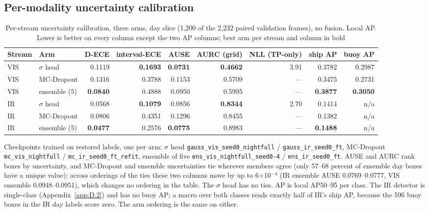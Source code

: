 \documentclass[journal,onecolumn]{IEEEtran}
\begin{document}
\subsection{Per-modality uncertainty calibration}\label{app:E.1}
\begin{table}[htbp]
\centering
\footnotesize
\caption{Per-stream uncertainty calibration, three arms, day slice (1,200 of the 2,232 paired validation frames), no fusion. Local AP. Lower is better on every column except the two AP columns; best arm per stream and column in bold}
\label{tab:9}
\setlength{\tabcolsep}{3pt}
\begin{adjustbox}{max width=\linewidth}
\begin{tabular}{llrrrrrrr}
\toprule
Stream & Arm & D-ECE & interval-ECE & AUSE & AURC (grid) & NLL (TP-only) & ship AP & buoy AP \\
\midrule
VIS & $\sigma$ head & 0.1119 & \textbf{0.1693} & \textbf{0.0731} & \textbf{0.4662} & 3.91 & 0.3782 & 0.2987 \\
VIS & MC-Dropout & 0.1316 & 0.3788 & 0.1153 & 0.5709 & --- & 0.3475 & 0.2731 \\
VIS & ensemble (5) & \textbf{0.0840} & 0.4888 & 0.0950 & 0.5995 & --- & \textbf{0.3877} & \textbf{0.3050} \\
IR & $\sigma$ head & 0.0568 & \textbf{0.1079} & 0.0856 & \textbf{0.8344} & 2.70 & 0.1414 & n/a \\
IR & MC-Dropout & 0.0806 & 0.4351 & 0.1296 & 0.8455 & --- & 0.1382 & n/a \\
IR & ensemble (5) & \textbf{0.0477} & 0.2576 & \textbf{0.0775} & 0.8983 & --- & \textbf{0.1488} & n/a \\
\bottomrule
\end{tabular}
\end{adjustbox}
\par\smallskip\raggedright\footnotesize Checkpoints trained on restored labels, one per arm: $\sigma$ head \texttt{gauss\_\allowbreak{}vis\_\allowbreak{}seed0\_\allowbreak{}nightfull} / \texttt{gauss\_\allowbreak{}ir\_\allowbreak{}seed0\_\allowbreak{}ft}, MC-Dropout \texttt{mc\_\allowbreak{}vis\_\allowbreak{}nightfull} / \texttt{mc\_\allowbreak{}ir\_\allowbreak{}seed0\_\allowbreak{}ft\_\allowbreak{}refit}, ensemble of five \texttt{ens\_\allowbreak{}vis\_\allowbreak{}nightfull\_\allowbreak{}seed0-\allowbreak{}4} / \texttt{ens\_\allowbreak{}ir\_\allowbreak{}seed0\_\allowbreak{}ft}. AUSE and AURC rank boxes by uncertainty, and MC-Dropout and ensemble uncertainties tie wherever members agree (only 57--68 percent of ensemble day boxes have a unique value); across orderings of the ties these two columns move by up to 6$\times$10$^{-4}$ (IR ensemble AUSE 0.0769--0.0777, VIS ensemble 0.0948--0.0951), which changes no ordering in the table. The $\sigma$ head has no ties. AP is local AP50--95 per class. The IR detector is single-class (Appendix~\ref{app:D.2}) and has no buoy AP; a macro over both classes reads exactly half of IR's ship AP, because the 596 buoy boxes in the IR day labels score zero. The arm ordering is the same on either.
\end{table}
\end{document}
